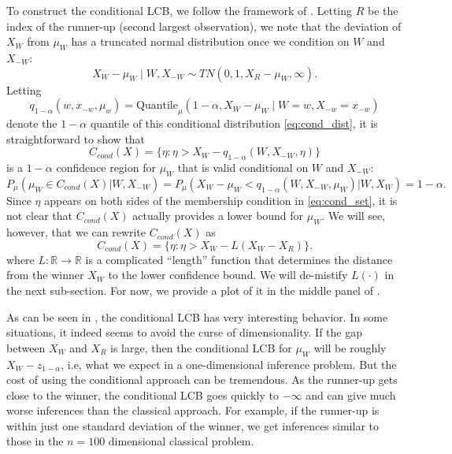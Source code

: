 \documentclass{article}
\newcommand{\R}{\mathbb{R}}
\begin{document}
\begin{appendix}
To construct the conditional LCB, we follow the framework of \cite{Fithian2017}. Letting $R$ be the index of the runner-up (second largest observation), we note that the deviation of $X_{W}$ from $\mu_{W}$ has a truncated normal distribution once we condition on $W$ and $X_{-W}$:
\begin{equation}
    \label{eq:cond_dist}
    X_W - \mu_W \mid W, X_{-W} \sim TN(0, 1, X_{R} - \mu_{W}, \infty).
\end{equation}
Letting 
\begin{equation}
    \label{eq:cond_quantile}
    q_{1-\alpha}(w, x_{-w}, \mu_w) = \text{Quantile}_{\mu}(1-\alpha, X_W -  \mu_{W} \mid W=w, X_{-w} = x_{-w})
\end{equation}
denote the $1-\alpha$ quantile of this conditional distribution \eqref{eq:cond_dist}, it is straightforward to show that
\begin{equation}
\label{eq:cond_set}
     C_{cond}(X) = \{\eta : \eta > X_{W} - q_{1-\alpha}(W, X_{-W}, \eta)  \} 
\end{equation}
is a $1-\alpha$ confidence region for $\mu_{W}$ that is valid  conditional on $W$ and  $X_{-W}$:
\begin{equation*}
    P_{\mu}( \mu_{W} \in C_{cond}(X) | W, X_{-W})  = P_{\mu}( X_W - \mu_W < q_{1-\alpha}(W, X_{-W}, \mu_{W}) |W, X_W) = 1-\alpha.
\end{equation*}
Since $\eta$ appears on both sides of the membership condition in \eqref{eq:cond_set}, it is not clear that $C_{cond}(X)$ actually provides a lower bound for $\mu_{W}$. We will see, however, that we can rewrite $C_{cond}(X)$ as 
\begin{equation}
\label{eq:cond_lcb}
     C_{cond}(X) = \{\eta : \eta > X_{W} - L(X_W - X_R)  \}. 
\end{equation}
where $L: \R \rightarrow \R$ is a complicated ``length'' function that determines the distance from the winner $X_W$ to the lower confidence bound. We will de-mistify $L(\cdot)$ in the next sub-section. For now, we provide a plot of it in the middle panel of .

As can be seen in , the conditional LCB has very interesting behavior. In some situations, it indeed seems to avoid the curse of dimensionality. If the gap between $X_W$ and $X_R$ is large, then the conditional LCB for $\mu_W$ will be roughly $X_{W} - z_{1-\alpha}$, i.e, what we expect in a one-dimensional inference problem. But the cost of using the conditional approach can be tremendous. As the runner-up gets close to the winner, the conditional LCB goes quickly to $-\infty$ and can give much worse inferences than the classical approach. For example, if the runner-up is within just one standard deviation of the winner, we get inferences similar to those in the $n = 100$ dimensional classical problem. 


\end{appendix}
\end{document}
